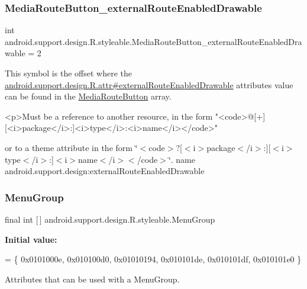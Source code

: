 \subsubsection{\texorpdfstring{Media\+Route\+Button\+\_\+external\+Route\+Enabled\+Drawable}{MediaRouteButton\_externalRouteEnabledDrawable}}
{\footnotesize\ttfamily int android.\+support.\+design.\+R.\+styleable.\+Media\+Route\+Button\+\_\+external\+Route\+Enabled\+Drawable = 2\hspace{0.3cm}{\ttfamily [static]}}

This symbol is the offset where the \hyperlink{classandroid_1_1support_1_1design_1_1R_1_1attr_ab10411e3c39861612dd04971d76f133f}{android.\+support.\+design.\+R.\+attr\#external\+Route\+Enabled\+Drawable} attribute\textquotesingle{}s value can be found in the \hyperlink{classandroid_1_1support_1_1design_1_1R_1_1styleable_a13f16932c8dfbb7db000019830744f57}{Media\+Route\+Button} array.

\begin{DoxyVerb}      <p>Must be a reference to another resource, in the form "<code>@[+][<i>package</i>:]<i>type</i>:<i>name</i></code>"
\end{DoxyVerb}
 or to a theme attribute in the form \char`\"{}$<$code$>$?\mbox{[}$<$i$>$package$<$/i$>$\+:\mbox{]}\mbox{[}$<$i$>$type$<$/i$>$\+:\mbox{]}$<$i$>$name$<$/i$>$$<$/code$>$\char`\"{}.  name android.\+support.\+design\+:external\+Route\+Enabled\+Drawable \mbox{\label{classandroid_1_1support_1_1design_1_1R_1_1styleable_a39805bd4a947832cbac3bd5f30eef344}} 
\subsubsection{\texorpdfstring{Menu\+Group}{MenuGroup}}
{\footnotesize\ttfamily final int \mbox{[}$\,$\mbox{]} android.\+support.\+design.\+R.\+styleable.\+Menu\+Group\hspace{0.3cm}{\ttfamily [static]}}

{\bfseries Initial value\+:}
\begin{DoxyCode}
= \{
            0x0101000e, 0x010100d0, 0x01010194, 0x010101de,
            0x010101df, 0x010101e0
        \}
\end{DoxyCode}
Attributes that can be used with a Menu\+Group. 

